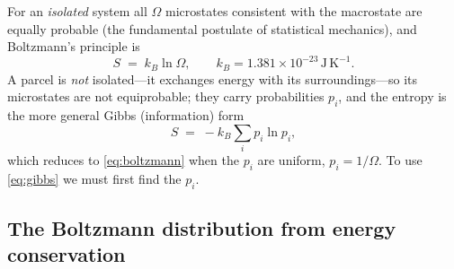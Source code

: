 \documentclass[11pt,a4paper]{article}
\theoremstyle{definition}
\begin{document}
For an \emph{isolated} system all $\Omega$ microstates consistent with the
macrostate are equally probable (the fundamental postulate of statistical
mechanics), and Boltzmann's principle is
\begin{equation}\label{eq:boltzmann}
S \;=\; k_B \ln \Omega ,\qquad k_B=1.381\times10^{-23}\,\mathrm{J\,K^{-1}} .
\end{equation}
A parcel is \emph{not} isolated---it exchanges energy with its surroundings---so
its microstates are not equiprobable; they carry probabilities $p_i$, and the
entropy is the more general Gibbs (information) form
\begin{equation}\label{eq:gibbs}
S \;=\; -k_B \sum_i p_i \ln p_i ,
\end{equation}
which reduces to \eqref{eq:boltzmann} when the $p_i$ are uniform, $p_i=1/\Omega$.
To use \eqref{eq:gibbs} we must first find the $p_i$.

\subsection{The Boltzmann distribution from energy conservation}\label{ssec:boltzdist}
\end{document}
